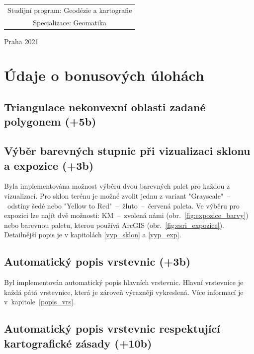 \documentclass[a4paper, 12pt, oneside, titlepage]{article} %
\begin{document}
\begin{center}
\begin{tabular}{c}
Studijní program: Geodézie a kartografie \\
\noalign{\vspace{2mm}}

Specializace: Geomatika\\

\end{tabular}


\vfill

Praha 2021

\end{center}



\clearpage
\section{Údaje o bonusových úlohách}
\subsection{Triangulace nekonvexní oblasti zadané polygonem (+5b)}

\subsection{Výběr barevných stupnic při vizualizaci sklonu a expozice (+3b)}
Byla implementována možnost výběru dvou barevných palet pro každou z vizualizací. Pro sklon terénu je možné zvolit jednu z variant "Grayscale"~--~odstíny šedé nebo "Yellow to Red"~--~žluto~--~červená paleta. Ve výběru pro expozici lze najít dvě možnosti: KM~--~zvolená námi (obr.~\ref{fig:expozice_barvy}) nebo barevnou paletu, kterou používá ArcGIS (obr.~\ref{fig:esri_expozice}). Detailnější popis je v kapitolách \ref{vyp_sklon} a \ref{vyp_exp}.


\subsection{Automatický popis vrstevnic (+3b)}
Byl implementován automatický popis hlavních vrstevnic. Hlavní vrstevnice je každá pátá vrstevnice, která je zároveň výrazněji vykreslená. Více informací je v~kapitole~\ref{popis_vrs}.

\subsection{Automatický popis vrstevnic respektující kartografické zásady (+10b)}
\end{document}
